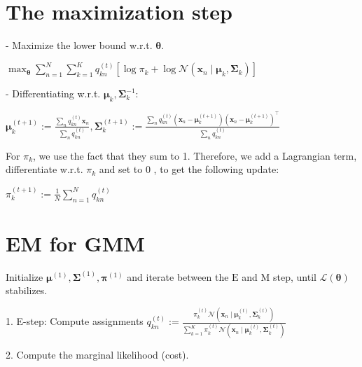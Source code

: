 \section*{The maximization step}
- Maximize the lower bound w.r.t. $\boldsymbol{\theta}$.

$\max _{\boldsymbol{\theta}} \sum_{n=1}^{N} \sum_{k=1}^{K} q_{k n}^{(t)}\left[\log \pi_{k}+\log \mathcal{N}\left(\mathbf{x}_{n} \mid \boldsymbol{\mu}_{k}, \boldsymbol{\Sigma}_{k}\right)\right]$

- Differentiating w.r.t. $\boldsymbol{\mu}_{k}, \boldsymbol{\Sigma}_{k}^{-1}$:

$\boldsymbol{\mu}_{k}^{(t+1)} := \frac{\sum_{n} q_{k n}^{(t)} \mathbf{x}_{n}}{\sum_{n} q_{k n}^{(t)}},
\boldsymbol{\Sigma}_{k}^{(t+1)} := \frac{\sum_{n} q_{k n}^{(t)} (\mathbf{x}_{n}-\boldsymbol{\mu}_{k}^{(t+1)})(\mathbf{x}_{n}-\boldsymbol{\mu}_{k}^{(t+1)})^{\top}}{\sum_{n} q_{k n}^{(t)}}$


For $\pi_{k}$, we use the fact that they sum to 1. Therefore, we add a Lagrangian term, differentiate w.r.t. $\pi_{k}$ and set to 0 , to get the following update:

$
\pi_{k}^{(t+1)}:=\frac{1}{N} \sum_{n=1}^{N} q_{k n}^{(t)}
$

\section*{EM for GMM}
Initialize $\boldsymbol{\mu}^{(1)}, \boldsymbol{\Sigma}^{(1)}, \boldsymbol{\pi}^{(1)}$ and iterate between the $\mathrm{E}$ and $\mathrm{M}$ step, until $\mathcal{L}(\boldsymbol{\theta})$ stabilizes.

1. E-step: Compute assignments
$
q_{k n}^{(t)}:=\frac{\pi_{k}^{(t)} \mathcal{N}\left(\mathbf{x}_{n} \mid \boldsymbol{\mu}_{k}^{(t)}, \boldsymbol{\Sigma}_{k}^{(t)}\right)}{\sum_{k=1}^{K} \pi_{k}^{(t)} \mathcal{N}\left(\mathbf{x}_{n} \mid \boldsymbol{\mu}_{k}^{(t)}, \boldsymbol{\Sigma}_{k}^{(t)}\right)}
$

2. Compute the marginal likelihood (cost).

